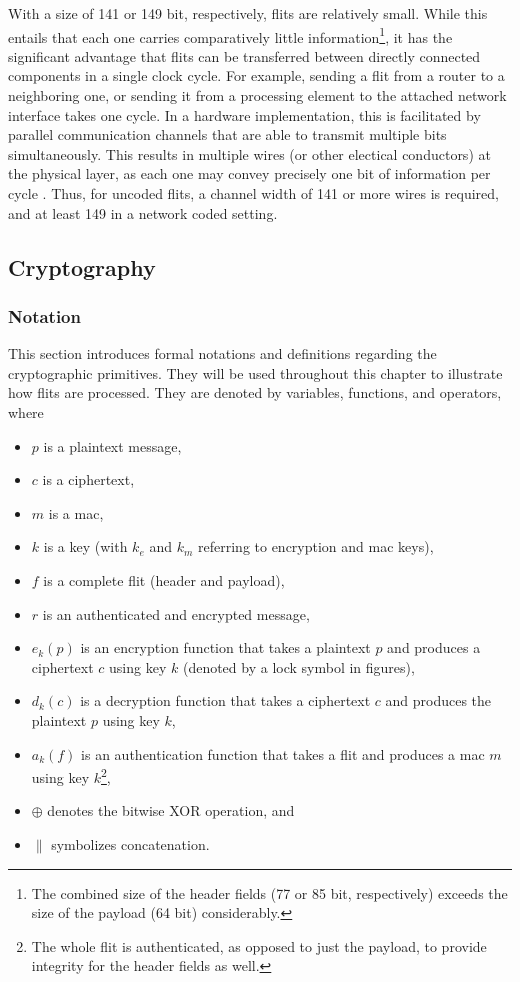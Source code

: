 With a size of 141 or 149 bit, respectively, flits are relatively small. While this entails that each one carries comparatively little
information\footnote{The combined size of the header fields (77 or 85 bit, respectively) exceeds the size of the payload (64 bit) considerably.}, it
has the significant advantage that flits can be transferred between directly connected components in a single clock
cycle. For example, sending a flit from a router to a neighboring one, or sending it from a processing element
to the attached network interface takes one cycle. In a hardware implementation, this is facilitated by parallel communication channels that are able
to transmit multiple bits simultaneously. This results in multiple wires (or other electical conductors) at the physical layer, as each one may convey
precisely one bit of information per cycle \cite{wikiparallelcomm}. Thus, for uncoded flits, a channel width of 141 or more wires is required, and at least 149
in a network coded setting.%

\subsection{Cryptography}\label{subsec:crypto}
\subsubsection{Notation}\label{subsubsec:cryptonotation}
This section introduces formal notations and definitions regarding the cryptographic primitives. They will be used throughout this chapter to
illustrate how flits are processed. They are denoted by variables, functions, and operators, where
\begin{itemize}
    \item $p$ is a plaintext message,
    \item $c$ is a ciphertext,
    \item $m$ is a \gls{mac},
    \item $k$ is a key (with $k_e$ and $k_m$ referring to encryption and \gls{mac} keys),
    \item $f$ is a complete flit (header and payload),
    \item $r$ is an authenticated and encrypted message,
    \item $e_k(p)$ is an encryption function that takes a plaintext $p$ and produces a ciphertext $c$ using key $k$ (denoted by a lock
        symbol in figures),
    \item $d_k(c)$ is a decryption function that takes a ciphertext $c$ and produces the plaintext $p$ using key $k$,
    \item $a_k(f)$ is an authentication function that takes a flit and produces a \gls{mac} $m$ using key $k$\footnote{The whole flit is
        authenticated, as opposed to just the payload, to provide integrity for the header fields as well.},
    \item $\oplus$ denotes the bitwise XOR operation, and
    \item $\|$ symbolizes concatenation.
\end{itemize}
\vspace{0.5\baselineskip}


